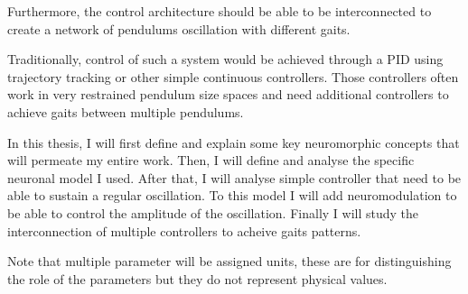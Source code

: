 Furthermore, the control architecture should be able to  be interconnected to create a network of pendulums oscillation with different gaits.

Traditionally, control of such a system would be achieved through a PID using trajectory tracking or other simple continuous controllers. Those controllers often work in very restrained pendulum size spaces and need additional controllers to achieve gaits between multiple pendulums.

In this thesis, I will first define and explain some key neuromorphic concepts that will permeate my entire work. Then, I will define and analyse the specific neuronal model I used. After that, I will analyse simple controller that need to be able to sustain a regular oscillation. To this model I will add neuromodulation to be able to control the amplitude of the oscillation. Finally I will study the interconnection of multiple controllers to acheive gaits patterns.

Note that multiple parameter will be assigned units, these are for distinguishing the role of the parameters but they do not represent physical values. 
